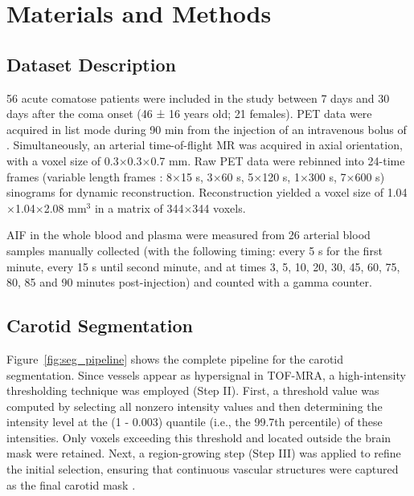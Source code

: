 \chapter{Materials and Methods}

\section{Dataset Description}

56 acute comatose patients were included in the study between 7 days and 30 days after the coma onset (46 ± 16 years old; 21 females).
PET data were acquired in list mode during 90 min from the injection of an intravenous bolus of \fdg.
Simultaneously, an arterial time-of-flight MR was acquired in axial orientation, with a voxel size of 0.3$\times$0.3$\times$0.7 mm.
Raw PET data were rebinned into 24-time frames (variable length frames : 8$\times$15 s, 3$\times$60 s, 5$\times$120 s, 1$\times$300 s, 7$\times$600 s) sinograms for dynamic reconstruction.
Reconstruction yielded a voxel size of 1.04$\times$1.04$\times$2.08 mm$^3$ in a matrix of 344$\times$344 voxels.

AIF in the whole blood and plasma were measured from 26 arterial blood samples manually collected (with the following timing: every 5 s for the first minute, every 15 s until second minute, and at times 3, 5, 10, 20, 30, 45, 60, 75, 80, 85 and 90 minutes post-injection) and counted with a gamma counter.


\section{Carotid Segmentation\label{sec:carotid}}
Figure~\ref{fig:seg_pipeline} shows the complete pipeline for the carotid segmentation.
Since vessels appear as hypersignal in TOF-MRA, a high-intensity thresholding technique was employed (Step II).
First, a threshold value was computed by selecting all nonzero intensity values and then determining the intensity level at the (1 - 0.003) quantile (i.e., the 99.7th percentile) of these intensities.
Only voxels exceeding this threshold and located outside the brain mask were retained.
Next, a region-growing step (Step III) was applied to refine the initial selection, ensuring that continuous vascular structures were captured as the final carotid mask \cite{irace2021bayesian}.

